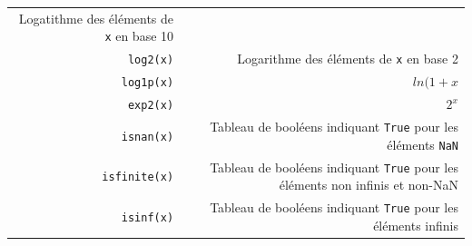 \documentclass[12pt,]{book}
\numberwithin{equation}{section}
\numberwithin{countremarque}{section}
\begin{document}
\begin{longtable}[]{@{}rr@{}}
\begin{minipage}[t]{0.71\columnwidth}
Logatithme des éléments de \texttt{x} en base 10\strut
\end{minipage}\tabularnewline
\begin{minipage}[t]{0.18\columnwidth}\raggedleft\strut
\texttt{log2(x)}\strut
\end{minipage} & \begin{minipage}[t]{0.71\columnwidth}\raggedleft\strut
Logarithme des éléments de \texttt{x} en base 2\strut
\end{minipage}\tabularnewline
\begin{minipage}[t]{0.18\columnwidth}\raggedleft\strut
\texttt{log1p(x)}\strut
\end{minipage} & \begin{minipage}[t]{0.71\columnwidth}\raggedleft\strut
\(ln(1+x\)\strut
\end{minipage}\tabularnewline
\begin{minipage}[t]{0.18\columnwidth}\raggedleft\strut
\texttt{exp2(x)}\strut
\end{minipage} & \begin{minipage}[t]{0.71\columnwidth}\raggedleft\strut
\(2^x\)\strut
\end{minipage}\tabularnewline
\begin{minipage}[t]{0.18\columnwidth}\raggedleft\strut
\texttt{isnan(x)}\strut
\end{minipage} & \begin{minipage}[t]{0.71\columnwidth}\raggedleft\strut
Tableau de booléens indiquant \texttt{True} pour les éléments
\texttt{NaN}\strut
\end{minipage}\tabularnewline
\begin{minipage}[t]{0.18\columnwidth}\raggedleft\strut
\texttt{isfinite(x)}\strut
\end{minipage} & \begin{minipage}[t]{0.71\columnwidth}\raggedleft\strut
Tableau de booléens indiquant \texttt{True} pour les éléments non
infinis et non-NaN\strut
\end{minipage}\tabularnewline
\begin{minipage}[t]{0.18\columnwidth}\raggedleft\strut
\texttt{isinf(x)}\strut
\end{minipage} & \begin{minipage}[t]{0.71\columnwidth}\raggedleft\strut
Tableau de booléens indiquant \texttt{True} pour les éléments
infinis\strut
\end{minipage}\tabularnewline
\bottomrule
\end{longtable}
\end{document}
